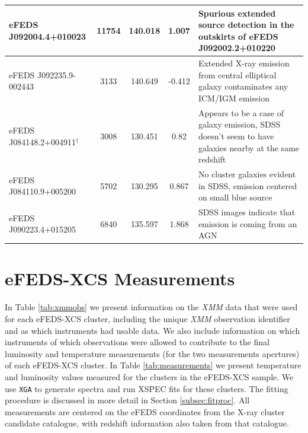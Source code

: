 \documentclass[fleqn,usenatbib]{mnras}
\begin{document}
\begin{table}
\begin{center}
\begin{tabular}{lccc|l}
\hline
eFEDS J092004.4+010023 & 11754 & 140.018 & 1.007 & Spurious extended source detection in the outskirts of eFEDS J092002.2+010220 \\ 
\hline
eFEDS J092235.9-002443 & 3133 & 140.649 & -0.412 & Extended X-ray emission from central elliptical galaxy contaminates any ICM/IGM emission\\
\hline
eFEDS J084148.2+004911$^{\dagger}$ & 3008 & 130.451 & 0.82 & Appears to be a case of galaxy emission, SDSS doesn't seem to have galaxies nearby at the same redshift\\
\hline
eFEDS J084110.9+005200 & 5702 & 130.295 & 0.867 & No cluster galaxies evident in SDSS, emission centered on small blue source\\
\hline
eFEDS J090223.4+015205 & 6840 & 135.597 & 1.868 & SDSS images indicate that emission is coming from an AGN \\
\hline
\end{tabular}
\end{center}
\end{table}

\section{eFEDS-XCS Measurements}
\label{app:measurements}
In Table \ref{tab:xmmobs} we present information on the {\em XMM} data that were used for each eFEDS-XCS cluster, including the unique {\em XMM} observation identifier and as which instruments had usable data. We also include information on which instruments of which observations were allowed to contribute to the final luminosity and temperature measurements (for the two measurements apertures) of each eFEDS-XCS cluster. 
In Table \ref{tab:measurements} we present temperature and luminosity values measured for the clusters in the eFEDS-XCS sample. We use \texttt{XGA} to generate spectra and run XSPEC fits for these clusters. The fitting procedure is discussed in more detail in Section \ref{subsec:fitproc}. All measurements are centered on the eFEDS coordinates from the X-ray cluster candidate catalogue, with redshift information also taken from that catalogue.
\end{document}
